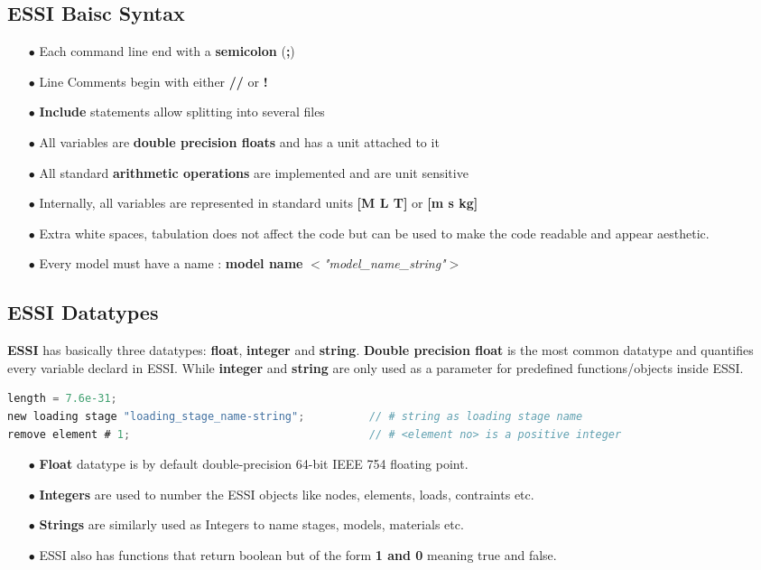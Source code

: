\documentclass{article}
\begin{document}
\subsection{ESSI Baisc Syntax}

\begin{itemize}
\item[$\bullet$]Each command line end with a \textbf{semicolon} (\textbf{;})
\item[$\bullet$]Line Comments begin with either \textbf{//} or \textbf{!}
\item[$\bullet$]\textbf{Include} statements allow splitting into several files
\item[$\bullet$]All variables are \textbf{double precision floats} and has a unit attached to it
\item[$\bullet$]All standard \textbf{arithmetic operations} are implemented and are unit sensitive
\item[$\bullet$]Internally, all variables are represented in standard units \textbf{[M L T]} or \textbf{[m s kg]} 
\item[$\bullet$]Extra white spaces, tabulation does not affect the code but can be used to make the code readable and appear aesthetic. 
\item[$\bullet$]Every model must have a name : \textbf{model name} 
\textit{$<$"model\_name\_string"$>$}
\end{itemize}

\subsection{ESSI Datatypes}
\textbf{ESSI} has basically three datatypes: \textbf{float}, \textbf{integer} and \textbf{string}. \textbf{Double precision float} is the most common datatype and quantifies every variable declard in ESSI. While \textbf{integer} and \textbf{string} are only used as a parameter for predefined functions/objects inside ESSI.

\begin{lstlisting}[language=C]
length = 7.6e-31;
new loading stage "loading_stage_name-string";          // # string as loading stage name
remove element # 1;                                     // # <element no> is a positive integer                      
\end{lstlisting}

\begin{itemize}
\item[$\bullet$]\textbf{Float} datatype is by default double-precision 64-bit IEEE 754 floating point. 
\item[$\bullet$]\textbf{Integers} are used to number the ESSI objects like nodes, elements, loads, contraints etc.
\item[$\bullet$]\textbf{Strings} are similarly used as Integers to name stages, models, materials etc.
\item[$\bullet$]ESSI also has functions that return boolean but of the form \textbf{1 and 0} meaning true and false.  
\end{itemize}
\end{document}
